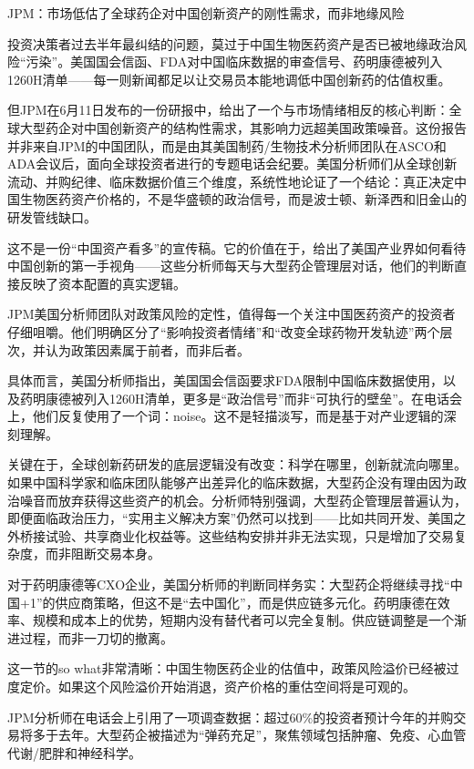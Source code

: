 \documentclass[11pt]{ctexart}
\begin{document}
JPM：市场低估了全球药企对中国创新资产的刚性需求，而非地缘风险

投资决策者过去半年最纠结的问题，莫过于中国生物医药资产是否已被地缘政治风险“污染”。美国国会信函、FDA对中国临床数据的审查信号、药明康德被列入1260H清单——每一则新闻都足以让交易员本能地调低中国创新药的估值权重。

但JPM在6月11日发布的一份研报中，给出了一个与市场情绪相反的核心判断：全球大型药企对中国创新资产的结构性需求，其影响力远超美国政策噪音。这份报告并非来自JPM的中国团队，而是由其美国制药/生物技术分析师团队在ASCO和ADA会议后，面向全球投资者进行的专题电话会纪要。美国分析师们从全球创新流动、并购纪律、临床数据价值三个维度，系统性地论证了一个结论：真正决定中国生物医药资产价格的，不是华盛顿的政治信号，而是波士顿、新泽西和旧金山的研发管线缺口。

这不是一份“中国资产看多”的宣传稿。它的价值在于，给出了美国产业界如何看待中国创新的第一手视角——这些分析师每天与大型药企管理层对话，他们的判断直接反映了资本配置的真实逻辑。

JPM美国分析师团队对政策风险的定性，值得每一个关注中国医药资产的投资者仔细咀嚼。他们明确区分了“影响投资者情绪”和“改变全球药物开发轨迹”两个层次，并认为政策因素属于前者，而非后者。

具体而言，美国分析师指出，美国国会信函要求FDA限制中国临床数据使用，以及药明康德被列入1260H清单，更多是“政治信号”而非“可执行的壁垒”。在电话会上，他们反复使用了一个词：noise。这不是轻描淡写，而是基于对产业逻辑的深刻理解。

关键在于，全球创新药研发的底层逻辑没有改变：科学在哪里，创新就流向哪里。如果中国科学家和临床团队能够产出差异化的临床数据，大型药企没有理由因为政治噪音而放弃获得这些资产的机会。分析师特别强调，大型药企管理层普遍认为，即便面临政治压力，“实用主义解决方案”仍然可以找到——比如共同开发、美国之外桥接试验、共享商业化权益等。这些结构安排并非无法实现，只是增加了交易复杂度，而非阻断交易本身。

对于药明康德等CXO企业，美国分析师的判断同样务实：大型药企将继续寻找“中国+1”的供应商策略，但这不是“去中国化”，而是供应链多元化。药明康德在效率、规模和成本上的优势，短期内没有替代者可以完全复制。供应链调整是一个渐进过程，而非一刀切的撤离。

这一节的so what非常清晰：中国生物医药企业的估值中，政策风险溢价已经被过度定价。如果这个风险溢价开始消退，资产价格的重估空间将是可观的。

JPM分析师在电话会上引用了一项调查数据：超过60\%的投资者预计今年的并购交易将多于去年。大型药企被描述为“弹药充足”，聚焦领域包括肿瘤、免疫、心血管代谢/肥胖和神经科学。
\end{document}
